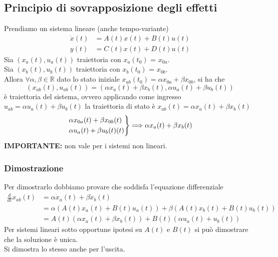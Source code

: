 \documentclass{article}
\numberwithin{equation}{subsection}
\let\oldsubsection\subsection%
\renewcommand{\subsection}{%
  \renewcommand{\theequation}{\thesubsection.\arabic{equation}}%
  \oldsubsection}%
\begin{document}
\subsection{Principio di sovrapposizione degli effetti}
Prendiamo un sistema lineare (anche tempo-variante)
\begin{align*}
    \dot x(t) &= A(t)x(t) + B(t)u(t)\\
    y(t) &= C(t)x(t) + D(t)u(t)
\end{align*}
Sia $(x_a (t), u_a (t))$ traiettoria con $x_a (t_0)$ = $x_{0a}$.\\
Sia $(x_b (t), u_b (t))$ traiettoria con $x_b (t_0)$ = $x_{0b}$.
\vspace*{0.1cm}\\
Allora $\forall \alpha, \beta \in \mathbb{R}$ dato lo stato iniziale $x_{ab}(t_0) = \alpha x_{0a}+\beta x_{0b}$, si ha che
\begin{equation}
    (x_{ab}(t), u_{ab}(t)) = (\alpha x_{a}(t) + \beta x_b(t), \alpha u_a(t)+\beta u_b(t))
\end{equation}
è traiettoria del sistema, ovvero applicando come ingresso $u_{ab}=\alpha u_a(t) + \beta u_b(t)$ la traiettoria di stato è $x_{ab} (t) = \alpha x_a (t) + \beta x_b (t)$
\begin{equation}
    \begin{rcases}
        \alpha x_{0a}(t)+\beta x_{0b}(t)\\
        \alpha u_a(t) + \beta u_b(t)(t)
    \end{rcases}
    \Longrightarrow
    \alpha x_a(t) + \beta x_b(t)
\end{equation}
\vspace*{0.2cm}
\textbf{IMPORTANTE:} non vale per i sistemi non lineari.

\subsubsection*{Dimostrazione}
Per dimostrarlo dobbiamo provare che soddisfa l'equazione differenziale
\begin{align*}
    \frac{d}{dt}x_{ab}(t) &= \alpha \dot x_a(t) + \beta \dot x_b(t)\\
    &= \alpha(A(t)x_a (t) + B(t)u_a (t)) + \beta (A(t)x_b (t) + B(t)u_b (t))\\
    &= A(t)(\alpha x_a (t) + \beta x_b (t)) + B(t)( \alpha u_a (t) + u_b (t))
\end{align*}
Per sistemi lineari sotto opportune ipotesi su $A(t)$ e $B(t)$ si può dimostrare che la soluzione è unica.\\
Si dimostra lo stesso anche per l'uscita.
\end{document}
